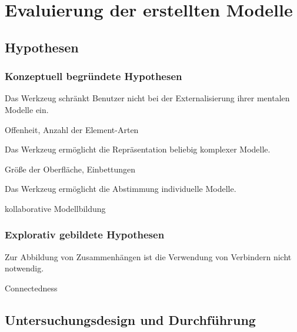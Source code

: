 \chapter{Evaluierung der erstellten Modelle} %
\label{cha:eval_modell}

\section{Hypothesen} %
\label{sec:m_hypothesen}

\subsection{Konzeptuell begründete Hypothesen} %
\label{sub:m_konzeptuell_begründete_hypothesen}

\begin{hyp}
	Das Werkzeug schränkt Benutzer nicht bei der Externalisierung ihrer mentalen Modelle ein.
\end{hyp}
Offenheit, Anzahl der Element-Arten
	
\begin{hyp}
	Das Werkzeug ermöglicht die Repräsentation beliebig komplexer Modelle.
\end{hyp}
Größe der Oberfläche, Einbettungen

\begin{hyp}
	Das Werkzeug ermöglicht die Abstimmung individuelle Modelle.
\end{hyp}
kollaborative Modellbildung


\subsection{Explorativ gebildete Hypothesen} %
\label{sub:m_explorativ_gebildete_hypothesen}

\begin{hyp}
	Zur Abbildung von Zusammenhängen ist die Verwendung von Verbindern nicht notwendig.
\end{hyp}
Connectedness



\section{Untersuchungsdesign und Durchführung} %
\label{sec:m_untersuchungsdesign}

